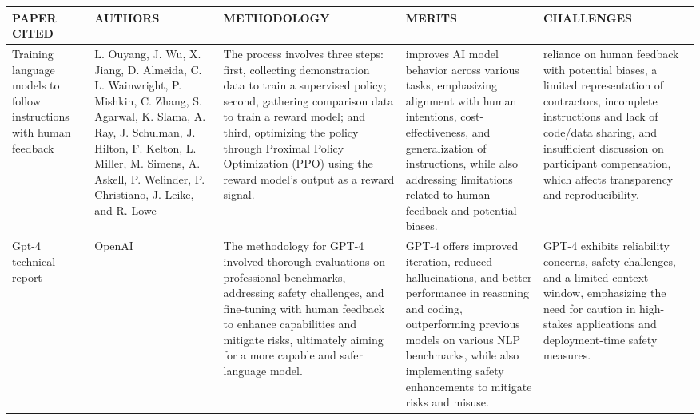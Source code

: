 \documentclass[conference]{IEEEtran}
\begin{document}
\begin{table}
\begin{center}
 \centering
    \begin{tabular}{ |p{2cm}|p{2cm}|p{4cm}|p{3cm}|p{4cm}| }
\hline
\centering PAPER CITED & \centering  AUTHORS & \centering METHODOLOGY &  \centering MERITS &  \centering CHALLENGES \arraybackslash \\ 
\hline
[39]  Training language models to follow instructions
with human feedback & L. Ouyang, J. Wu, X. Jiang, D. Almeida, C. L. Wainwright, P. Mishkin, C. Zhang, S. Agarwal, K. Slama, A. Ray, J. Schulman, J. Hilton, F. Kelton, L. Miller, M. Simens, A. Askell, P. Welinder, P. Christiano, J. Leike, and R. Lowe & The process involves three steps: first, collecting demonstration data to train a supervised policy; second, gathering comparison data to train a reward model; and third, optimizing the policy through Proximal Policy Optimization (PPO) using the reward model's output as a reward signal. & improves AI model behavior across various tasks, emphasizing alignment with human intentions, cost-effectiveness, and generalization of instructions, while also addressing limitations related to human feedback and potential biases. & reliance on human feedback with potential biases, a limited representation of contractors, incomplete instructions and lack of code/data sharing, and insufficient discussion on participant compensation, which affects transparency and reproducibility. \\
\hline
[40] Gpt-4 technical report & OpenAI & The methodology for GPT-4 involved thorough evaluations on professional benchmarks, addressing safety challenges, and fine-tuning with human feedback to enhance capabilities and mitigate risks, ultimately aiming for a more capable and safer language model. & GPT-4 offers improved iteration, reduced hallucinations, and better performance in reasoning and coding, outperforming previous models on various NLP benchmarks, while also implementing safety enhancements to mitigate risks and misuse. & GPT-4 exhibits reliability concerns, safety challenges, and a limited context window, emphasizing the need for caution in high-stakes applications and deployment-time safety measures. \\
\hline
\end{tabular}
\end{center}
\end{table}
\end{document}
